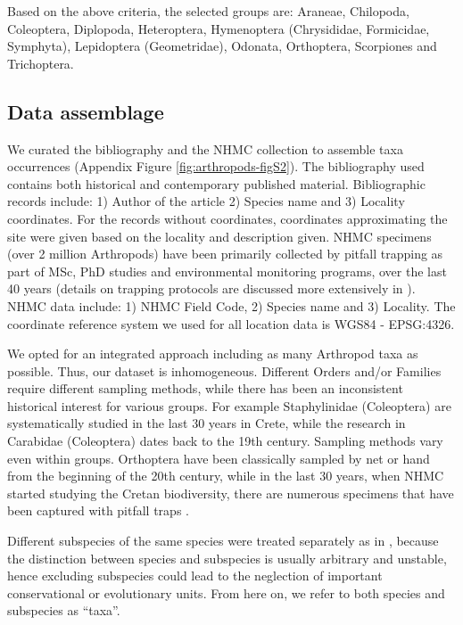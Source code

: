 Based on the above criteria, the selected groups are:
Araneae, Chilopoda, Coleoptera, Diplopoda, Heteroptera, Hymenoptera (Chrysididae, Formicidae, Symphyta), Lepidoptera (Geometridae), Odonata, Orthoptera, Scorpiones and Trichoptera.

    \subsection{Data assemblage}
    \label{subsec:arthropods-data-assemblage}

We curated the bibliography and the NHMC collection to assemble taxa
occurrences (Appendix Figure \ref{fig:arthropods-figS2}). The bibliography used
contains both historical and contemporary published material. Bibliographic
records include: 1) Author of the article 2) Species name and 3) Locality coordinates.
For the records without coordinates, coordinates approximating the site were
given based on the locality and description given. NHMC specimens (over 2
million Arthropods) have been primarily collected by pitfall trapping as part
of MSc, PhD studies and environmental monitoring programs, over the last 40
years (details on trapping protocols are discussed more extensively in \textcite{salata2020how-estimated,willemse2023a-review}).
NHMC data include: 1) NHMC Field Code, 2) Species name and 3) Locality.
The coordinate reference system we used for all location data is WGS84 - EPSG:4326.

We opted for an integrated approach including as many Arthropod taxa as
possible. Thus, our dataset is inhomogeneous. Different Orders and/or Families
require different sampling methods, while there has been an inconsistent
historical interest for various groups. For example Staphylinidae (Coleoptera)
are systematically studied in the last 30 years in Crete, while the research in
Carabidae (Coleoptera) dates back to the 19th century. Sampling methods vary
even within groups. Orthoptera have been classically sampled by net or hand
from the beginning of the 20th century, while in the last 30 years, when NHMC
started studying the Cretan biodiversity, there are numerous specimens that
have been captured with pitfall traps \parencite{willemse2023a-review}.

Different subspecies of the same species were treated separately as in \textcite{dimitrakopoulos2004questioning,fattorini2006spatial,fattorini2012species},
because the distinction between species and subspecies is usually arbitrary and
unstable, hence excluding subspecies could lead to the neglection of important
conservational or evolutionary units. From here on, we refer to both species
and subspecies as “taxa”.
    

